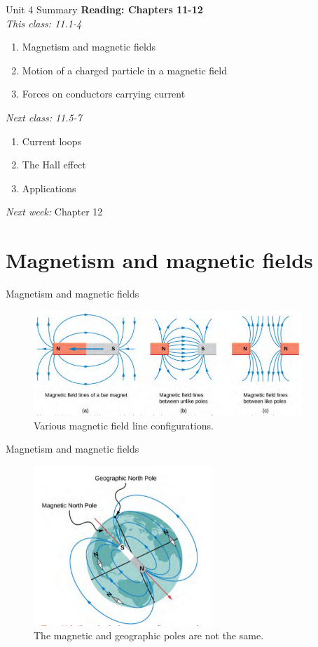 \documentclass{beamer}
\begin{document}
\begin{frame}{Unit 4 Summary}
\textbf{Reading: Chapters 11-12} \\ \vspace{0.5cm}
\textit{This class: 11.1-4}
\begin{enumerate}
\item Magnetism and magnetic fields
\item Motion of a charged particle in a magnetic field
\item Forces on conductors carrying current
\end{enumerate}
\textit{Next class: 11.5-7}
\begin{enumerate}
\item Current loops
\item The Hall effect
\item Applications
\end{enumerate}
\textit{Next week:} Chapter 12
\end{frame}

\section{Magnetism and magnetic fields}

\begin{frame}{Magnetism and magnetic fields}
\begin{figure}
\centering
\includegraphics[width=0.9\textwidth,trim=0cm 1cm 0cm 0cm,clip=true]{figures/fields1.png}
\caption{\label{fields1} Various magnetic field line configurations.}
\end{figure}
\end{frame}

\begin{frame}{Magnetism and magnetic fields}
\begin{figure}
\centering
\includegraphics[width=0.6\textwidth,trim=0cm 0.1cm 0cm 0cm,clip=true]{figures/fields2.png}
\caption{\label{fields2} The magnetic and geographic poles are not the same.}
\end{figure}
\end{frame}
\end{document}
